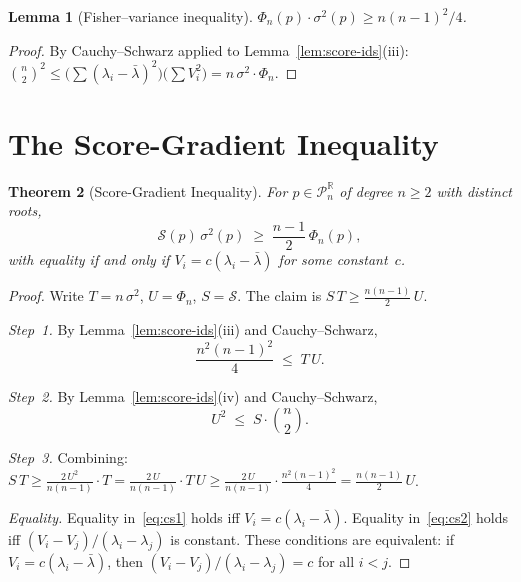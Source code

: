 \documentclass[11pt,a4paper]{amsart}
\theoremstyle{plain}
\newtheorem{theorem}{Theorem}[section]
\newtheorem{lemma}[theorem]{Lemma}
\theoremstyle{definition}
\theoremstyle{remark}
\newcommand{\R}{\mathbb{R}}
\newcommand{\PnR}[1][n]{\mathcal{P}^{\R}_{#1}}
\begin{document}
\begin{lemma}[Fisher--variance inequality]
\label{lem:fisher-var}
$\Phi_n(p)\cdot\sigma^2(p)\ge n(n-1)^2/4$.
\end{lemma}

\begin{proof}
By Cauchy--Schwarz applied to
Lemma~\ref{lem:score-ids}(iii):
$\binom{n}{2}^2
\le\bigl(\sum(\lambda_i-\bar\lambda)^2\bigr)
  \bigl(\sum V_i^2\bigr)
=n\,\sigma^2\cdot\Phi_n$.
\end{proof}


\section{The Score-Gradient Inequality}
\label{sec:sgi}

\begin{theorem}[Score-Gradient Inequality]
\label{thm:sgi}
For $p\in\PnR$ of degree $n\ge 2$ with distinct roots,
\begin{equation}\label{eq:sgi}
  \mathcal{S}(p)\,\sigma^2(p)
  \;\ge\;\frac{n-1}{2}\,\Phi_n(p),
\end{equation}
with equality if and only if $V_i=c(\lambda_i-\bar\lambda)$
for some constant~$c$.
\end{theorem}

\begin{proof}
Write $T=n\,\sigma^2$, $U=\Phi_n$, $S=\mathcal{S}$.
The claim is $S\,T\ge\frac{n(n-1)}{2}\,U$.

\emph{Step~1.}
By Lemma~\ref{lem:score-ids}(iii) and Cauchy--Schwarz,
\begin{equation}\label{eq:cs1}
  \frac{n^2(n-1)^2}{4}\;\le\;T\,U.
\end{equation}

\emph{Step~2.}
By Lemma~\ref{lem:score-ids}(iv) and Cauchy--Schwarz,
\begin{equation}\label{eq:cs2}
  U^2\;\le\;S\cdot\binom{n}{2}.
\end{equation}

\emph{Step~3.}
Combining:
$S\,T
\ge\frac{2\,U^2}{n(n-1)}\cdot T
=\frac{2\,U}{n(n-1)}\cdot T\,U
\ge\frac{2\,U}{n(n-1)}\cdot\frac{n^2(n-1)^2}{4}
=\frac{n(n-1)}{2}\,U$.

\emph{Equality.}
Equality in~\eqref{eq:cs1} holds iff
$V_i=c(\lambda_i-\bar\lambda)$.
Equality in~\eqref{eq:cs2} holds iff
$(V_i-V_j)/(\lambda_i-\lambda_j)$ is constant.
These conditions are equivalent: if
$V_i=c(\lambda_i-\bar\lambda)$, then
$(V_i-V_j)/(\lambda_i-\lambda_j)=c$ for all $i<j$.
\end{proof}
\end{document}
